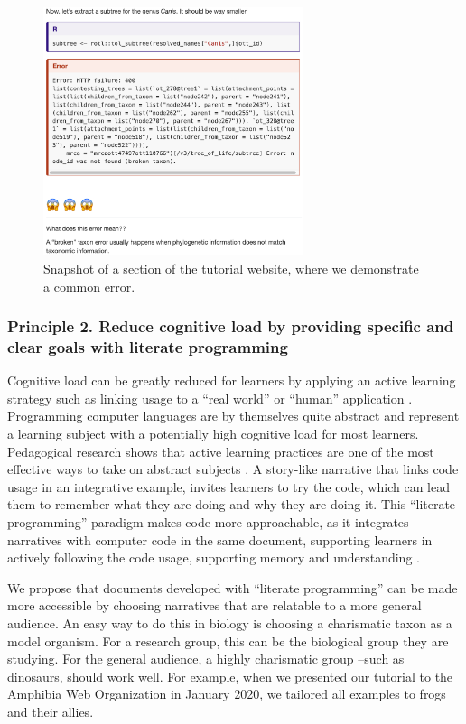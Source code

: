 \documentclass[12pt]{article}
\begin{document}
\begin{figure}
\begin{center}
\includegraphics[width=3in]{fig_error.png}
\end{center}
\caption{Snapshot of a section of the tutorial website, where we demonstrate a common error. \label{fig:error}}
\end{figure}

\subsubsection*{Principle 2. Reduce cognitive load by providing specific and clear goals with literate programming}

Cognitive load can be greatly reduced for learners by applying an active learning strategy such as linking usage to a ``real world'' or ``human'' application \citep{felder2009active}.
Programming computer languages are by themselves quite abstract and represent a learning subject with a potentially high cognitive load for most learners.
Pedagogical research shows that active learning practices are one of the most effective ways to take on abstract subjects \citep{freeman2014active}.
A story-like narrative that links code usage in an integrative example, invites learners to try the code, which can lead them to remember what they are doing and why they are doing it.
This ``literate programming'' paradigm \citep{knuth1984literate, fritzson2002mathmodelica} makes code more approachable, as it integrates narratives with computer code in the same document, supporting learners in actively following the code usage, supporting memory and understanding \citep{piccolo2016tools}.

We propose that documents developed with ``literate programming'' can be made more accessible by choosing narratives that are relatable to a more general audience.
An easy way to do this in biology is choosing a charismatic taxon as a model organism.
For a research group, this can be the biological group they are studying. For the general audience, a highly charismatic group --such as dinosaurs, should work well.
For example, when we presented our tutorial to the Amphibia Web Organization \citep{van2002amphibiaweb} in January 2020, we tailored all examples to frogs and their allies.
\end{document}

